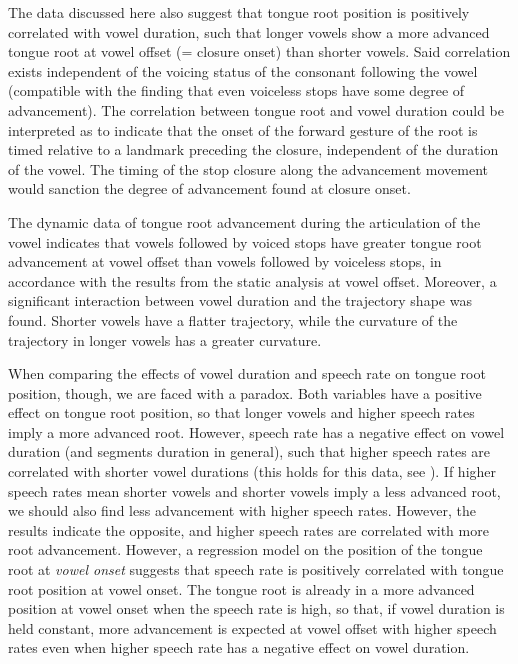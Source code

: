 \documentclass[
  12pt,
]{article}
\begin{document}
The data discussed here also suggest that tongue root position is
positively correlated with vowel duration, such that longer vowels show
a more advanced tongue root at vowel offset (= closure onset) than
shorter vowels. Said correlation exists independent of the voicing
status of the consonant following the vowel (compatible with the finding
that even voiceless stops have some degree of advancement). The
correlation between tongue root and vowel duration could be interpreted
as to indicate that the onset of the forward gesture of the root is
timed relative to a landmark preceding the closure, independent of the
duration of the vowel. The timing of the stop closure along the
advancement movement would sanction the degree of advancement found at
closure onset.

The dynamic data of tongue root advancement during the articulation of
the vowel indicates that vowels followed by voiced stops have greater
tongue root advancement at vowel offset than vowels followed by
voiceless stops, in accordance with the results from the static analysis
at vowel offset. Moreover, a significant interaction between vowel
duration and the trajectory shape was found. Shorter vowels have a
flatter trajectory, while the curvature of the trajectory in longer
vowels has a greater curvature.

When comparing the effects of vowel duration and speech rate on tongue
root position, though, we are faced with a paradox. Both variables have
a positive effect on tongue root position, so that longer vowels and
higher speech rates imply a more advanced root. However, speech rate has
a negative effect on vowel duration (and segments duration in general),
such that higher speech rates are correlated with shorter vowel
durations (this holds for this data, see \citealt{coretta2018j}). If
higher speech rates mean shorter vowels and shorter vowels imply a less
advanced root, we should also find less advancement with higher speech
rates. However, the results indicate the opposite, and higher speech
rates are correlated with more root advancement. However, a regression
model on the position of the tongue root at \emph{vowel onset} suggests
that speech rate is positively correlated with tongue root position at
vowel onset. The tongue root is already in a more advanced position at
vowel onset when the speech rate is high, so that, if vowel duration is
held constant, more advancement is expected at vowel offset with higher
speech rates even when higher speech rate has a negative effect on vowel
duration.
\end{document}
